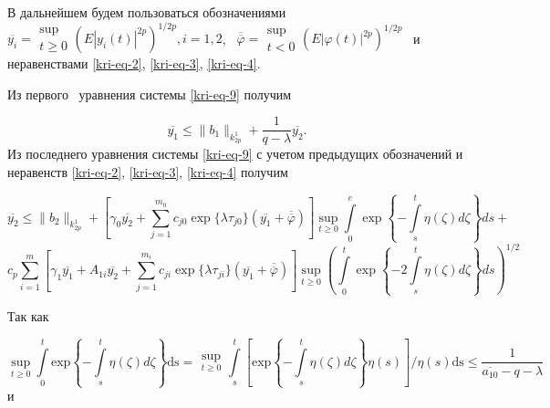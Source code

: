 В дальнейшем будем пользоваться обозначениями \  $\overline{y_i}=\begin{matrix}\sup\\t\ge
0\end{matrix}\left(E|y_i(t)|^{2p}\right)^{1/2p},i=1,2$, \  $\overline{\overline{\varphi
}}=\begin{matrix}\sup\\t<0\end{matrix}\left(E|\varphi (t)|^{2p}\right)^{1/2p}$ \ и неравенствами \eqref{kri-eq-2}, \eqref{kri-eq-3}, \eqref{kri-eq-4}.

Из первого \ уравнения системы \eqref{kri-eq-9} получим

\begin{equation*}
\overline{y_1}\le \|b_1\|_{k_{2p}^1}+\frac 1{q-\lambda }\overline{y_2}.
\end{equation*}
Из последнего уравнения системы \eqref{kri-eq-9} с учетом предыдущих обозначений и неравенств \eqref{kri-eq-2}, \eqref{kri-eq-3}, \eqref{kri-eq-4} получим

\begin{equation*}
  \overline{y_2} \leq \|b_2\|_{k_{2p}^1} + \left[ \gamma_0 \overline{y_2} + \sum\limits_{j=1}^{m_0} c_{j0} \exp\{\lambda\tau_{j0}\}(\overline{y_1}+\overline{\overline{\varphi}}) \right]
\sup\limits_{t\geq0} \int\limits_{0}^{e} \exp\left\{-\int\limits_{s}^{t} \eta(\zeta)d\zeta\right\}ds +
\end{equation*}
\begin{equation}\label{kri-eq-10}
c_p \sum\limits_{i=1}^{m} \left[\gamma_1\overline{y_1}+A_{1i}\overline{y_2}+\sum\limits_{j=1}^{m_i} c_{ji}\exp \{\lambda\tau_{ji}\}(\overline{y_1}+\overline{\overline{\varphi}})\right]
\sup\limits_{t\geq0} \left(\int\limits_{0}^{t}\exp\left\{ -2\int\limits_{s}^{t} \eta(\zeta)d\zeta \right\} ds \right)^{1/2}
\end{equation}

Так как

\begin{equation*}
\sup\limits_{t\ge 0}\overset t{\underset 0{\int }}\text{exp}\left\{-\overset t{\underset s{\int
}}\eta (\zeta )\mathit{d\zeta }\right\}\text{ds}=\begin{matrix}\sup\limits_{t\ge
0}\end{matrix}\overset t{\underset s{\int }}\left[\text{exp}\left\{-\overset t{\underset s{\int }}\eta (\zeta
)\mathit{d\zeta }\right\}\eta (s)\right]/\eta (s)\text{ds}\le \frac 1{\overline{a_{10}}-q-\lambda }
\end{equation*}
и

